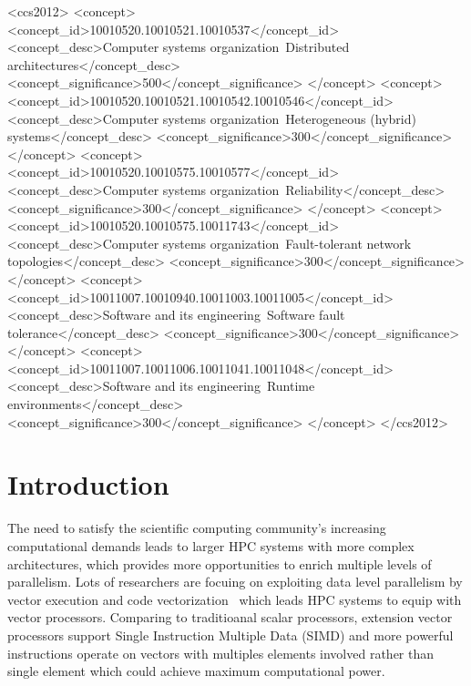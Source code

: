 \documentclass[sigconf]{acmart}
\begin{document}
%
\begin{CCSXML}
<ccs2012>
<concept>
<concept_id>10010520.10010521.10010537</concept_id>
<concept_desc>Computer systems organization~Distributed architectures</concept_desc>
<concept_significance>500</concept_significance>
</concept>
<concept>
<concept_id>10010520.10010521.10010542.10010546</concept_id>
<concept_desc>Computer systems organization~Heterogeneous (hybrid) systems</concept_desc>
<concept_significance>300</concept_significance>
</concept>
<concept>
<concept_id>10010520.10010575.10010577</concept_id>
<concept_desc>Computer systems organization~Reliability</concept_desc>
<concept_significance>300</concept_significance>
</concept>
<concept>
<concept_id>10010520.10010575.10011743</concept_id>
<concept_desc>Computer systems organization~Fault-tolerant network topologies</concept_desc>
<concept_significance>300</concept_significance>
</concept>
<concept>
<concept_id>10011007.10010940.10011003.10011005</concept_id>
<concept_desc>Software and its engineering~Software fault tolerance</concept_desc>
<concept_significance>300</concept_significance>
</concept>
<concept>
<concept_id>10011007.10011006.10011041.10011048</concept_id>
<concept_desc>Software and its engineering~Runtime environments</concept_desc>
<concept_significance>300</concept_significance>
</concept>
</ccs2012>
\end{CCSXML}



%
\maketitle

\section{Introduction}\label{sec:intro}
The need to satisfy the scientific computing community's increasing
computational demands leads to larger HPC systems with more complex architectures,
which provides more opportunities to enrich multiple levels of parallelism.
%
Lots of researchers are focuing on exploiting data level parallelism by vector
execution and code vectorization~\cite{Vectorizing-Compilers} which leads HPC
systems to equip with vector processors.
%
Comparing to traditioanal scalar processors, extension vector processors support
Single Instruction Multiple Data (SIMD) and more powerful instructions operate
on vectors with multiples elements involved rather than single element which
could achieve maximum computational power.
%
\end{document}
